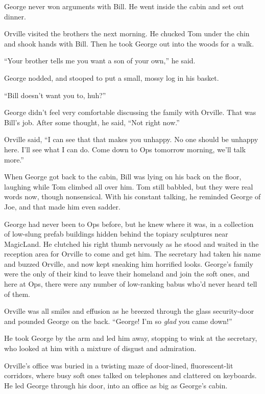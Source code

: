 George never won arguments with Bill. He went inside the cabin and
set out dinner.

\tb

Orville visited the brothers the next morning. He chucked Tom under
the chin and shook hands with Bill. Then he took George out into
the woods for a walk.

``Your brother tells me you want a son of your own,'' he said.

George nodded, and stooped to put a small, mossy log in his
basket.

``Bill doesn't want you to, huh?''

George didn't feel very comfortable discussing the family with
Orville. That was Bill's job. After some thought, he said,
``Not right now.''

Orville said,
``I can see that that makes you unhappy. No one should be unhappy here. I'll 
see what I can do. Come down to Ops tomorrow morning, we'll talk more.''

When George got back to the cabin, Bill was lying on his back on
the floor, laughing while Tom climbed all over him. Tom still
babbled, but they were real words now, though nonsensical. With his
constant talking, he reminded George of Joe, and that made him even
sadder.

\tb

George had never been to Ops before, but he knew where it was, in a
collection of low-slung prefab buildings hidden behind the topiary
sculptures near MagicLand. He clutched his right thumb nervously as
he stood and waited in the reception area for Orville to come and
get him. The secretary had taken his name and buzzed Orville, and
now kept sneaking him horrified looks. George's family were the
only of their kind to leave their homeland and join the soft ones,
and here at Ops, there were any number of low-ranking babus who'd
never heard tell of them.

Orville was all smiles and effusion as he breezed through the glass
security-door and pounded George on the back.
``George! I'm so \emph{glad} you came down!''

He took George by the arm and led him away, stopping to wink at the
secretary, who looked at him with a mixture of disgust and
admiration.

Orville's office was buried in a twisting maze of door-lined,
fluorescent-lit corridors, where busy soft ones talked on
telephones and clattered on keyboards. He led George through his
door, into an office as big as George's cabin.

